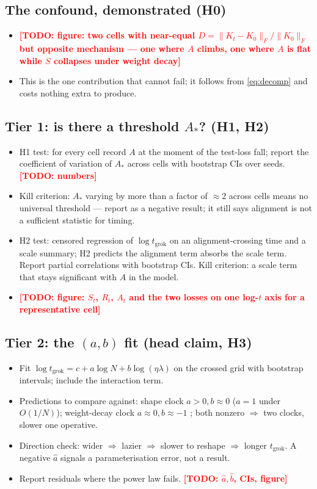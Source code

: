 \documentclass[a4paper,11pt]{article} %
\newcommand{\TODO}[1]{\textcolor{red}{\textbf{[TODO: #1]}}}
\newcommand{\Fnorm}[1]{\lVert #1 \rVert_F}
\newcommand{\tgrok}{t_{\mathrm{grok}}}
\newcommand{\Astar}{A_{*}}
\begin{document}
\subsection{The confound, demonstrated (H0)}
\begin{itemize}
	\item \TODO{figure: two cells with near-equal $D=\Fnorm{K_t-K_0}/\Fnorm{K_0}$
		but opposite mechanism --- one where $A$ climbs, one where $A$ is flat while
		$S$ collapses under weight decay}
	\item This is the one contribution that cannot fail; it follows from
		\eqref{eq:decomp} and costs nothing extra to produce.
\end{itemize}

\subsection{Tier 1: is there a threshold $\Astar$? (H1, H2)}
\begin{itemize}
	\item H1 test: for every cell record $A$ at the moment of the test-loss fall;
		report the coefficient of variation of $\Astar$ across cells with bootstrap
		CIs over seeds. \TODO{numbers}
	\item Kill criterion: $\Astar$ varying by more than a factor of $\approx2$
		across cells means no universal threshold --- report as a negative result;
		it still says alignment is not a sufficient statistic for timing.
	\item H2 test: censored regression of $\log\tgrok$ on an alignment-crossing
		time and a scale summary; H2 predicts the alignment term absorbs the scale
		term. Report partial correlations with bootstrap CIs. Kill criterion: a
		scale term that stays significant with $A$ in the model.
	\item \TODO{figure: $S_t$, $R_t$, $A_t$ and the two losses on one log-$t$ axis
		for a representative cell}
\end{itemize}

\subsection{Tier 2: the $(a,b)$ fit (head claim, H3)}
\begin{itemize}
	\item Fit $\log\tgrok=c+a\log N+b\log(\eta\lambda)$ on the crossed grid with
		bootstrap intervals; include the interaction term.
	\item Predictions to compare against: shape clock $a>0,b\approx0$
		($a=1$ under $O(1/N)$); weight-decay clock $a\approx0,b\approx-1$
		\citep{kim2026clock}; both nonzero $\Rightarrow$ two clocks, slower one
		operative.
	\item Direction check: wider $\Rightarrow$ lazier $\Rightarrow$ slower to
		reshape $\Rightarrow$ longer $\tgrok$. A negative $\hat a$ signals a
		parameterisation error, not a result.
	\item Report residuals where the power law fails. \TODO{$\hat a,\hat b$, CIs,
		figure}
\end{itemize}
\end{document}
